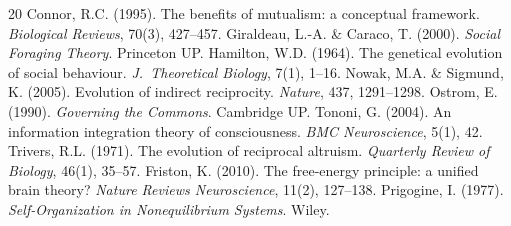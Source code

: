 \documentclass[12pt,a4paper]{article}
\begin{document}
\begin{thebibliography}{20}
 Connor, R.C. (1995). The benefits of mutualism: a conceptual framework. \textit{Biological Reviews}, 70(3), 427--457.
 Giraldeau, L.-A. \& Caraco, T. (2000). \textit{Social Foraging Theory}. Princeton UP.
 Hamilton, W.D. (1964). The genetical evolution of social behaviour. \textit{J.~Theoretical Biology}, 7(1), 1--16.
 Nowak, M.A. \& Sigmund, K. (2005). Evolution of indirect reciprocity. \textit{Nature}, 437, 1291--1298.
 Ostrom, E. (1990). \textit{Governing the Commons}. Cambridge UP.
 Tononi, G. (2004). An information integration theory of consciousness. \textit{BMC Neuroscience}, 5(1), 42.
 Trivers, R.L. (1971). The evolution of reciprocal altruism. \textit{Quarterly Review of Biology}, 46(1), 35--57.
 Friston, K. (2010). The free-energy principle: a unified brain theory? \textit{Nature Reviews Neuroscience}, 11(2), 127--138.
 Prigogine, I. (1977). \textit{Self-Organization in Nonequilibrium Systems}. Wiley.
\end{thebibliography}
\end{document}
